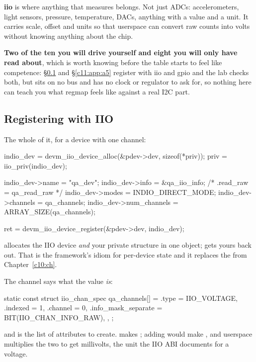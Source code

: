 \textbf{iio} is where anything that measures belongs. Not just ADCs: accelerometers, light sensors,
pressure, temperature, DACs, anything with a value and a unit. It carries scale, offset and units so
that userspace can convert raw counts into volts without knowing anything about the chip.

\textbf{Two of the ten you will drive yourself and eight you will only have read about}, which is
worth knowing before the table starts to feel like competence: \S\ref{c11:app:a4} and
\S\ref{c11:app:a5} register  with iio and gpio and the lab checks both, but
 sits on no bus and has no clock or regulator to ask for, so nothing here can teach you
what regmap feels like against a real I2C part.

\subsection{Registering with IIO}
\label{c11:app:a4}

The whole of it, for a device with one channel:

\begin{ccode}
indio_dev = devm_iio_device_alloc(&pdev->dev, sizeof(*priv));
priv      = iio_priv(indio_dev);

indio_dev->name          = "qa_dev";
indio_dev->info          = &qa_iio_info;      /* .read_raw = qa_read_raw */
indio_dev->modes         = INDIO_DIRECT_MODE;
indio_dev->channels      = qa_channels;
indio_dev->num_channels  = ARRAY_SIZE(qa_channels);

ret = devm_iio_device_register(&pdev->dev, indio_dev);
\end{ccode}

\noindent {} allocates the IIO device \emph{and} your private structure in
one object;  gets yours back out. That is the framework's idiom for per-device
state and it replaces the  from Chapter~\ref{c10:ch}.

The channel says what the value \emph{is}:

\begin{ccode}
static const struct iio_chan_spec qa_channels[] = {
        {
                .type                = IIO_VOLTAGE,
                .indexed             = 1,
                .channel             = 0,
                .info_mask_separate  = BIT(IIO_CHAN_INFO_RAW),
        },
};
\end{ccode}

\noindent and  is the list of attributes to create.
 makes ; adding  would make
, and userspace multiplies the two to get millivolts, the unit the IIO ABI
documents for a voltage.

